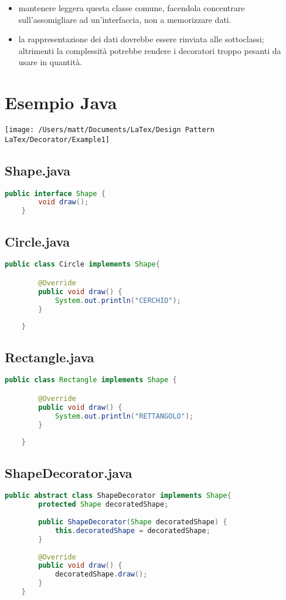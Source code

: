 \begin{itemize}
    \item mantenere leggera questa classe comune, facendola concentrare sull'assomigliare ad un'interfaccia, non a memorizzare dati.

    \item la rappresentazione dei dati dovrebbe essere rinviata alle sottoclassi; altrimenti la complessità potrebbe rendere i decoratori troppo pesanti da usare in quantità.
\end{itemize}


\section{Esempio Java}
\texttt{[image: /Users/matt/Documents/LaTex/Design Pattern LaTex/Decorator/Example1]}

\subsection{Shape.java}
\begin{lstlisting}[language=java]
    public interface Shape {
        void draw();
    }
\end{lstlisting}

\subsection{Circle.java}
\begin{lstlisting}[language=java]
    public class Circle implements Shape{

        @Override
        public void draw() {
            System.out.println("CERCHIO");
        }
        
    }
\end{lstlisting}

\subsection{Rectangle.java}
\begin{lstlisting}[language=java]
    public class Rectangle implements Shape {

        @Override
        public void draw() {
            System.out.println("RETTANGOLO");
        }
        
    }
\end{lstlisting}

\subsection{ShapeDecorator.java}
\begin{lstlisting}[language=java]
    public abstract class ShapeDecorator implements Shape{
        protected Shape decoratedShape;
    
        public ShapeDecorator(Shape decoratedShape) {
            this.decoratedShape = decoratedShape;
        }
    
        @Override
        public void draw() {
            decoratedShape.draw();
        }
    }
\end{lstlisting}

